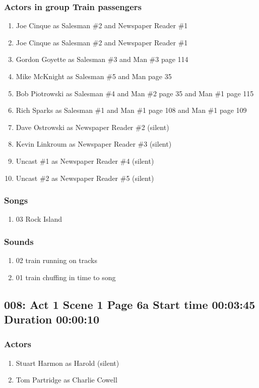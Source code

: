 \subsubsection{Actors in group Train passengers}
\begin{enumerate}
\item Joe Cinque as Salesman \#2 and Newspaper Reader \#1
\item Joe Cinque as Salesman \#2 and Newspaper Reader \#1
\item Gordon Goyette as Salesman \#3 and Man \#3 page 114
\item Mike McKnight as Salesman \#5 and Man page 35
\item Bob Piotrowski as Salesman \#4 and Man \#2 page 35 and Man \#1 page 115
\item Rich Sparks as Salesman \#1 and Man \#1 page 108 and Man \#1 page 109
\item Dave Ostrowski as Newspaper Reader \#2 (silent)
\item Kevin Linkroum as Newspaper Reader \#3 (silent)
\item Uncast \#1 as Newspaper Reader \#4 (silent)
\item Uncast \#2 as Newspaper Reader \#5 (silent)
\end{enumerate}

\subsubsection{Songs}
\begin{enumerate}
\item 03 Rock Island
\end{enumerate}\subsubsection{Sounds}
\begin{enumerate}
\item 02 train running on tracks
\item 01 train chuffing in time to song
\end{enumerate}
\subsection{008: Act 1 Scene 1 Page 6a Start time 00:03:45 Duration 00:00:10}

\subsubsection{Actors}
\begin{enumerate}
\item Stuart Harmon as Harold (silent)
\item Tom Partridge as Charlie Cowell
\end{enumerate}
